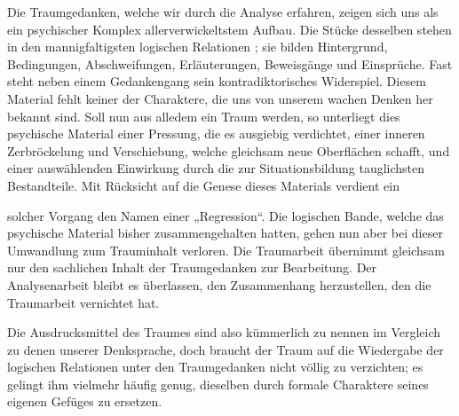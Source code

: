 \documentclass[twoside=true,titlepage=false,open=any, parskip=never, fontsize=10pt, headings=small, chapterprefix=false, appendixprefix=false]{scrbook}
\begin{document}
            
        \pstart
        Die Traumgedanken, welche wir durch die Analyse erfahren, zeigen sich uns als
               ein psychischer Komplex  allerverwickeltstem Aufbau. Die Stücke desselben stehen in den
               mannigfaltigsten logischen Relationen ; sie bilden  Hintergrund, Bedingungen, Abschweifungen, Erläuterungen,
               Beweisgänge und Einsprüche. Fast  steht neben einem Gedankengang sein kontradiktorisches
               Widerspiel. Diesem Material fehlt keiner der Charaktere, die uns von unserem
               wachen Denken her bekannt sind. Soll nun aus alledem ein Traum werden, so
                  unterliegt dies psychische Material einer Pressung, die es
               ausgiebig verdichtet, einer inneren Zerbröckelung und Verschiebung, welche
               gleichsam neue Oberflächen schafft, und einer auswählenden Einwirkung durch die
               zur Situationsbildung tauglichsten Bestandteile. Mit Rücksicht auf
               die Genese dieses Materials verdient ein
        \pend
    
         
            
            
            
        \pstart
        solcher Vorgang den Namen einer „Regression“. Die logischen Bande, welche das psychische Material bisher
               zusammengehalten hatten, gehen nun aber bei dieser Umwandlung zum
               Trauminhalt verloren. Die Traumarbeit übernimmt gleichsam nur den sachlichen Inhalt der Traumgedanken zur Bearbeitung. Der Analysenarbeit bleibt es überlassen, den Zusammenhang herzustellen, den
               die Traumarbeit vernichtet hat.
        \pend
    
            
        \pstart
        Die Ausdrucksmittel des Traumes sind also kümmerlich zu nennen im Vergleich zu
               denen unserer Denksprache, doch braucht der Traum auf die Wiedergabe der
               logischen Relationen unter den Traumgedanken nicht völlig zu verzichten; es
               gelingt ihm vielmehr häufig genug, dieselben durch formale Charaktere
               seines eigenen Gefüges zu ersetzen.
        \pend
    
\end{document}
